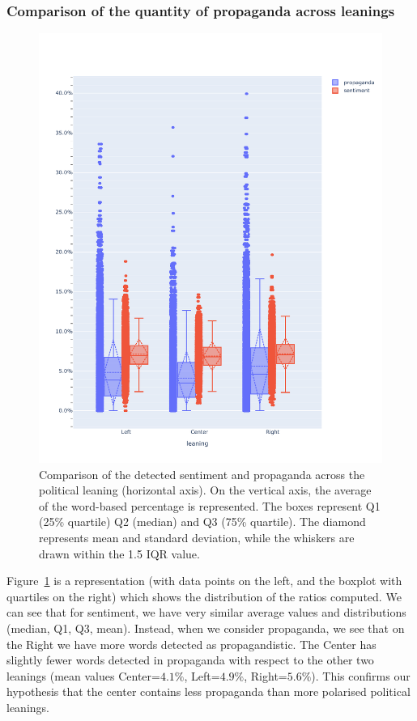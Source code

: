 \subsubsection{Comparison of the quantity of propaganda across leanings}

\begin{figure}[!htbp]
    \centering
    \includegraphics[width=\linewidth]{figures/prop_sent_tech_across_leaning_headlines_mod.pdf} %
    \caption{Comparison of the detected sentiment and propaganda across the political leaning (horizontal axis). On the vertical axis, the average of the word-based percentage is represented. The boxes represent Q1 (25\% quartile) Q2 (median) and Q3 (75\% quartile). The diamond represents mean and standard deviation, while the whiskers are drawn within the 1.5 IQR value.}
    \label{fig:prop_sent_across_leaning}
\end{figure}


Figure~\ref{fig:prop_sent_across_leaning} is a representation (with data points on the left, and the boxplot with quartiles on the right) which shows the distribution of the ratios computed. We can see that for sentiment, we have very similar average values and distributions (median, Q1, Q3, mean).
Instead, when we consider propaganda, we see that on the Right we have more words detected as propagandistic.
The Center has slightly fewer words detected in propaganda with respect to the other two leanings (mean values Center=$4.1\%$, Left=$4.9\%$, Right=$5.6\%$).
This confirms our hypothesis that the center contains less propaganda than more polarised political leanings.

